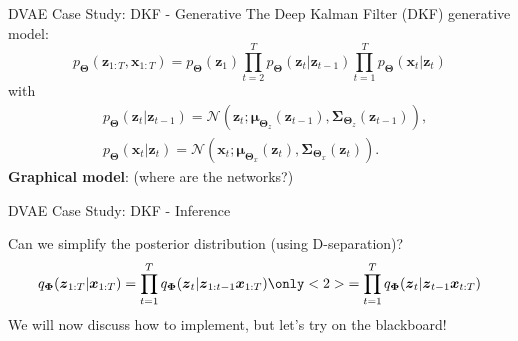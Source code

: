 \documentclass{beamer}
\newcommand{\bs}[1]{\boldsymbol{#1}}
\begin{document}
\begin{frame}{DVAE Case Study: DKF - Generative}
The Deep Kalman Filter (DKF) generative model:
\begin{equation}
  p_{\bs{\Theta}}(\bs{z}_{1:T},\bs{x}_{1:T}) = p_{\bs{\Theta}}(\bs{z}_1) \prod_{t=2}^T p_{\bs{\Theta}}(\bs{z}_t|\bs{z}_{t-1})\prod_{t=1}^T p_{\bs{\Theta}}(\bs{x}_t|\bs{z}_{t})
\end{equation}
with
\begin{align}
  &p_{\bs{\Theta}}(\bs{z}_t|\bs{z}_{t-1}) = \mathcal{N}(\bs{z}_t; \bs{\mu}_{\bs{\Theta}_z}(\bs{z}_{t-1}), \bs{\Sigma}_{\bs{\Theta}_z}(\bs{z}_{t-1})),\\
  & p_{\bs{\Theta}}(\bs{x}_t|\bs{z}_{t}) = \mathcal{N}(\bs{x}_t; \bs{\mu}_{\bs{\Theta}_x}(\bs{z}_{t}), \bs{\Sigma}_{\bs{\Theta}_x}(\bs{z}_{t})).
\end{align}
\textbf{Graphical model}: (where are the networks?)\vspace{1mm}\\
\centering
{}
\end{frame}

\begin{frame}{DVAE Case Study: DKF - Inference}
\begin{center}
\end{center}
Can we simplify the posterior distribution (using D-separation)? 
\begin{equation}
    q_{\bs{\Phi}}(\bs{z}_{1:T}|\bs{x}_{1:T}) = \prod_{t=1}^T q_{\bs{\Phi}}(\bs{z}_t | \bs{z}_{1:t-1} \bs{x}_{1:T}) \only<2>{= \prod_{t=1}^T q_{\bs{\Phi}}(\bs{z}_t | \bs{z}_{t-1} \bs{x}_{t:T})}
\end{equation}
We will now discuss how to implement, but let's try on the blackboard!
\end{frame}
\end{document}
